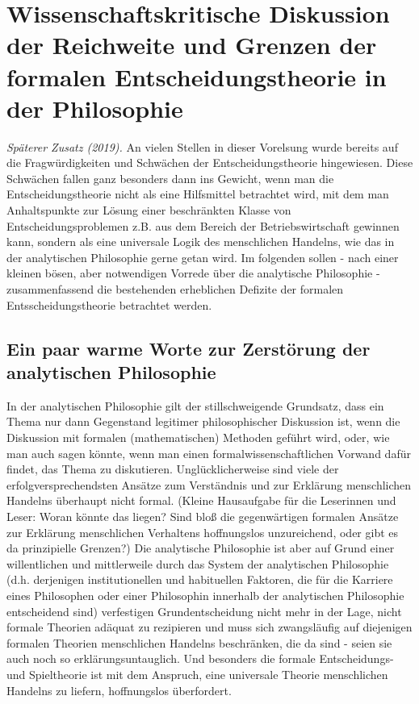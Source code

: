 \section{Wissenschaftskritische Diskussion der Reichweite und Grenzen der formalen Entscheidungstheorie in der Philosophie}

{\em Späterer Zusatz (2019).} An vielen Stellen in dieser Vorelsung wurde
bereits auf die Fragwürdigkeiten und Schwächen der Entscheidungstheorie
hingewiesen. Diese Schwächen fallen ganz besonders dann ins Gewicht, wenn man
die Entscheidungstheorie nicht als eine Hilfsmittel betrachtet wird, mit dem man
Anhaltspunkte zur Lösung einer beschränkten Klasse von Entscheidungsproblemen
z.B. aus dem Bereich der Betriebswirtschaft gewinnen kann, sondern als eine
universale Logik des menschlichen Handelns, wie das in der analytischen
Philosophie gerne getan wird. Im folgenden sollen - nach einer kleinen bösen,
aber notwendigen Vorrede über die analytische Philosophie - zusammenfassend die
bestehenden erheblichen Defizite der formalen Entsscheidungstheorie betrachtet
werden.

\subsection{Ein paar warme Worte zur Zerstörung der analytischen Philosophie}

In der analytischen Philosophie gilt der stillschweigende Grundsatz,
dass ein Thema nur dann Gegenstand legitimer philosophischer
Diskussion ist, wenn die Diskussion mit formalen (mathematischen)
Methoden geführt wird, oder, wie man auch sagen könnte, wenn man einen
formalwissenschaftlichen Vorwand dafür findet, das Thema zu
diskutieren.  Unglücklicherweise sind viele der erfolgversprechendsten
Ansätze zum Verständnis und zur Erklärung menschlichen Handelns
überhaupt nicht formal. (Kleine Hausaufgabe für die Leserinnen und
Leser: Woran könnte das liegen? Sind bloß die gegenwärtigen formalen
Ansätze zur Erklärung menschlichen Verhaltens hoffnungslos
unzureichend, oder gibt es da prinzipielle Grenzen?) Die analytische
Philosophie ist aber auf Grund einer willentlichen und mittlerweile
durch das System der analytischen Philosophie (d.h. derjenigen
institutionellen und habituellen Faktoren, die für die Karriere eines
Philosophen oder einer Philosophin innerhalb der analytischen
Philosophie entscheidend sind) verfestigen Grundentscheidung nicht
mehr in der Lage, nicht formale Theorien adäquat zu rezipieren und
muss sich zwangsläufig auf diejenigen formalen Theorien menschlichen
Handelns beschränken, die da sind - seien sie auch noch so
erklärungsuntauglich. Und besonders die formale Entscheidungs- und
Spieltheorie ist mit dem Anspruch, eine universale Theorie
menschlichen Handelns zu liefern, hoffnungslos überfordert.

